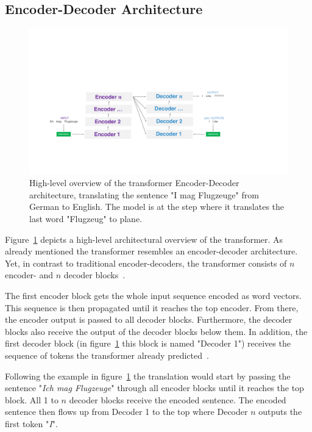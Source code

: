 \subsection{Encoder-Decoder Architecture}

\begin{figure}[htp]
    \centering
    \includegraphics[width=\textwidth]{figures/03_theory/03_transformer_Architecture_HighLevel}
    \caption{High-level overview of the transformer Encoder-Decoder architecture, translating the sentence "I mag Flugzeuge" from German to English. The model is at the step where it translates the last word "Flugzeug" to plane.}
    \label{fig:03_transformer_HighlevelOverview}
\end{figure}

Figure~\ref{fig:03_transformer_HighlevelOverview} depicts a high-level architectural overview of the transformer. As already mentioned the transformer resembles an encoder-decoder architecture. Yet, in contrast to traditional encoder-decoders, the transformer consists of $n$ encoder- and $n$ decoder blocks~\cite{Vaswani2017d}. 
\medskip

The first encoder block gets the whole input sequence encoded as word vectors. This sequence is then propagated until it reaches the top encoder. From there, the encoder output is passed to all decoder blocks. Furthermore, the decoder blocks also receive the output of the decoder blocks below them. In addition, the first decoder block {(in figure~\ref{fig:03_transformer_HighlevelOverview} this block is named "Decoder 1")} receives the sequence of tokens the transformer already predicted~\cite{Vaswani2017d}. 
\medskip

Following the example in figure~\ref{fig:03_transformer_HighlevelOverview} the translation would start by passing the sentence "\textit{Ich mag Flugzeuge}" through all encoder blocks until it reaches the top block. All 1 to $n$ decoder blocks receive the encoded sentence. The encoded sentence then flows up from Decoder 1 to the top where Decoder $n$ outputs the first token "\textit{I}".

